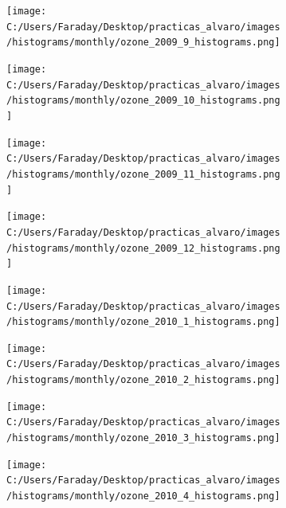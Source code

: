 \documentclass[12pt]{article}
\begin{document}
\begin{figure}[H]
\centering
\begin{subfigure}[h]{0.45\textwidth}
\texttt{[image: C:/Users/Faraday/Desktop/practicas\_alvaro/images/histograms/monthly/ozone\_2009\_9\_histograms.png]}
\caption{}
\label{fig:hist-mon-2-9-2009}
\end{subfigure}
%
\begin{subfigure}[H]{0.45\textwidth}
\texttt{[image: C:/Users/Faraday/Desktop/practicas\_alvaro/images/histograms/monthly/ozone\_2009\_10\_histograms.png]}
\caption{}
\label{fig:hist-mon-2-10-2009}
\end{subfigure}
\caption{}
\end{figure}

\begin{figure}[H]
\centering
\begin{subfigure}[h]{0.45\textwidth}
\texttt{[image: C:/Users/Faraday/Desktop/practicas\_alvaro/images/histograms/monthly/ozone\_2009\_11\_histograms.png]}
\caption{}
\label{fig:hist-mon-2-11-2009}
\end{subfigure}
%
\begin{subfigure}[H]{0.45\textwidth}
\texttt{[image: C:/Users/Faraday/Desktop/practicas\_alvaro/images/histograms/monthly/ozone\_2009\_12\_histograms.png]}
\caption{}
\label{fig:hist-mon-2-12-2009}
\end{subfigure}
\caption{}
\end{figure}

\newpage

\begin{figure}[H]
\centering
\begin{subfigure}[h]{0.45\textwidth}
\texttt{[image: C:/Users/Faraday/Desktop/practicas\_alvaro/images/histograms/monthly/ozone\_2010\_1\_histograms.png]}
\caption{}
\label{fig:hist-mon-2-1-2010}
\end{subfigure}
%
\begin{subfigure}[H]{0.45\textwidth}
\texttt{[image: C:/Users/Faraday/Desktop/practicas\_alvaro/images/histograms/monthly/ozone\_2010\_2\_histograms.png]}
\caption{}
\label{fig:hist-mon-2-2-2010}
\end{subfigure}
\caption{}
\end{figure}

\begin{figure}[H]
\centering
\begin{subfigure}[h]{0.45\textwidth}
\texttt{[image: C:/Users/Faraday/Desktop/practicas\_alvaro/images/histograms/monthly/ozone\_2010\_3\_histograms.png]}
\caption{}
\label{fig:hist-mon-2-3-2010}
\end{subfigure}
%
\begin{subfigure}[H]{0.45\textwidth}
\texttt{[image: C:/Users/Faraday/Desktop/practicas\_alvaro/images/histograms/monthly/ozone\_2010\_4\_histograms.png]}
\caption{}
\label{fig:hist-mon-2-4-2010}
\end{subfigure}
\caption{}
\end{figure}
\end{document}
